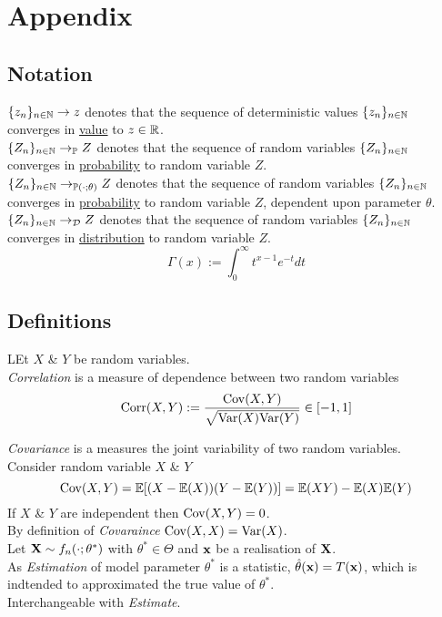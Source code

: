 \documentclass[11pt,a4paper]{article}
\begin{document}
\newpage
\setcounter{section}{-1}
\section{Appendix}

\subsection{Notation}

$\{z_n\}_{n\in\mathbb{N}}\to z$ denotes that the sequence of deterministic values $\{z_n\}_{n\in\mathbb{N}}$ converges in \underline{value} to $z\in\mathbb{R}$.\\
$\{Z_n\}_{n\in\mathbb{N}}\to_{\mathbb{P}} Z$ denotes that the sequence of random variables $\{Z_n\}_{n\in\mathbb{N}}$ converges in \underline{probability} to random variable $Z$.\\
$\{Z_n\}_{n\in\mathbb{N}}\to_{\mathbb{P}(\cdot;\theta)} Z$ denotes that the sequence of random variables $\{Z_n\}_{n\in\mathbb{N}}$ converges in \underline{probability} to random variable $Z$, dependent upon parameter $\theta$.\\
$\{Z_n\}_{n\in\mathbb{N}}\to_\mathcal{D} Z$ denotes that the sequence of random variables $\{Z_n\}_{n\in\mathbb{N}}$ converges in \underline{distribution} to random variable $Z$.\\

$$\Gamma(x):=\int_0^\infty t^{x-1}e^{-t}dt$$

\subsection{Definitions}

LEt $X$ \& $Y$ be random variables.\\
\textit{Correlation} is a measure of dependence between two random variables
$$\text{Corr}(X,Y):=\frac{\mathrm{Cov}(X,Y)}{\sqrt{\mathrm{Var}(X)\mathrm{Var}(Y)}}\in[-1,1]$$

\textit{Covariance} is a measures the joint variability of two random variables.\\
Consider random variable $X$ \& $Y$
$$\mathrm{Cov}(X,Y)=\mathbb{E}[(X-\mathbb{E}(X))(Y-\mathbb{E}(Y))]=\mathbb{E}(XY)-\mathbb{E}(X)\mathbb{E}(Y)$$
If $X$ \& $Y$ are independent then $\mathrm{Cov}(X,Y)=0$.\\
By definition of \textit{Covaraince} $\mathrm{Cov}(X,X)=\mathrm{Var}(X)$.\\

Let $\textbf{X}\sim f_n(\cdot;\theta^*)$ with $\theta^*\in\Theta$ and $\textbf{x}$ be a realisation of $\textbf{X}$.\\
As \textit{Estimation} of model parameter $\theta^*$ is a statistic, $\hat\theta(\textbf{x})=T(\textbf{x})$, which is indtended to approximated the true value of $\theta^*$.\\
\nb Interchangeable with \textit{Estimate}.\\
\end{document}
